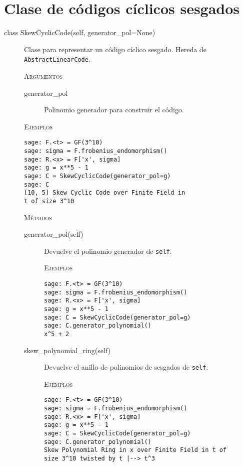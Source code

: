 \newpage
\section{Clase de códigos cíclicos sesgados}%
\label{sec:clase_de_códigos_cíclicos_sesgados}

\begin{description}
    \item[class SkewCyclicCode(self, generator\_pol=None)]
    Clase para representar un código cíclico sesgado. Hereda de \texttt{AbstractLinearCode}.

    \textsc{Argumentos}
    \begin{description}
        \item[generator\_pol] Polinomio generador para construir el código.
    \end{description}

    \textsc{Ejemplos}
    \begin{lstlisting}
sage: F.<t> = GF(3^10)
sage: sigma = F.frobenius_endomorphism()
sage: R.<x> = F['x', sigma]
sage: g = x**5 - 1
sage: C = SkewCyclicCode(generator_pol=g)
sage: C
[10, 5] Skew Cyclic Code over Finite Field in
t of size 3^10
    \end{lstlisting}

    \textsc{Métodos}
    \begin{description}
    \item[generator\_pol(self)]
    Devuelve el polinomio generador de \texttt{self}.

    \textsc{Ejemplos}
    \begin{lstlisting}
sage: F.<t> = GF(3^10)
sage: sigma = F.frobenius_endomorphism()
sage: R.<x> = F['x', sigma]
sage: g = x**5 - 1
sage: C = SkewCyclicCode(generator_pol=g)
sage: C.generator_polynomial()
x^5 + 2
    \end{lstlisting}

    \end{description}

    \begin{description}
    \item[skew\_polynomial\_ring(self)]
    Devuelve el anillo de polinomios de sesgados de \texttt{self}.

    \textsc{Ejemplos}
    \begin{lstlisting}
sage: F.<t> = GF(3^10)
sage: sigma = F.frobenius_endomorphism()
sage: R.<x> = F['x', sigma]
sage: g = x**5 - 1
sage: C = SkewCyclicCode(generator_pol=g)
sage: C.generator_polynomial()
Skew Polynomial Ring in x over Finite Field in t of
size 3^10 twisted by t |--> t^3
    \end{lstlisting}

    \end{description}

\end{description}

